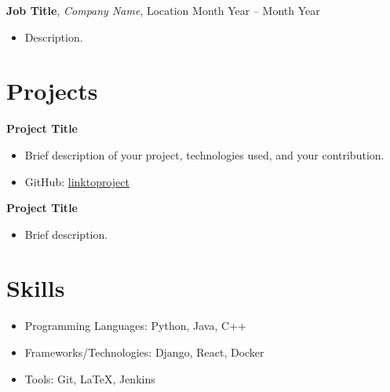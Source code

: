 \documentclass[11pt, a4paper]{article}
\begin{document}
\textbf{Job Title}, \textit{Company Name}, Location \hfill Month Year – Month Year
\begin{itemize}[noitemsep]
    \item Description.
\end{itemize}

\section*{Projects}
\textbf{Project Title}
\begin{itemize}[noitemsep]
    \item Brief description of your project, technologies used, and your contribution.
    \item GitHub: \href{https://github.com/linktoproject}{linktoproject}
\end{itemize}

\textbf{Project Title}
\begin{itemize}[noitemsep]
    \item Brief description.
\end{itemize}

\section*{Skills}
\begin{itemize}[noitemsep]
    \item Programming Languages: Python, Java, C++
    \item Frameworks/Technologies: Django, React, Docker
    \item Tools: Git, LaTeX, Jenkins
\end{itemize}
\end{document}

